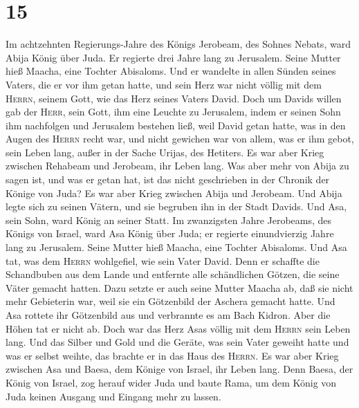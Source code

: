 \hypertarget{section-14}{%
\section{15}\label{section-14}}

 Im achtzehnten Regierungs-Jahre des Königs Jerobeam, des
Sohnes Nebats, ward Abija König über Juda.  Er regierte
drei Jahre lang zu Jerusalem. Seine Mutter hieß Maacha, eine Tochter
Abisaloms.  Und er wandelte in allen Sünden seines Vaters,
die er vor ihm getan hatte, und sein Herz war nicht völlig mit dem
\textsc{Herrn}, seinem Gott, wie das Herz seines Vaters David.
 Doch um Davids willen gab der \textsc{Herr}, sein Gott,
ihm eine Leuchte zu Jerusalem, indem er seinen Sohn ihm nachfolgen und
Jerusalem bestehen ließ,  weil David getan hatte, was in
den Augen des \textsc{Herrn} recht war, und nicht gewichen war von
allem, was er ihm gebot, sein Leben lang, außer in der Sache Urijas, des
Hetiters.  Es war aber Krieg zwischen Rehabeam und
Jerobeam, ihr Leben lang.  Was aber mehr von Abija zu
sagen ist, und was er getan hat, ist das nicht geschrieben in der
Chronik der Könige von Juda? Es war aber Krieg zwischen Abija und
Jerobeam.  Und Abija legte sich zu seinen Vätern, und sie
begruben ihn in der Stadt Davids. Und Asa, sein Sohn, ward König an
seiner Statt.  Im zwanzigsten Jahre Jerobeams, des Königs
von Israel, ward Asa König über Juda;  er regierte
einundvierzig Jahre lang zu Jerusalem. Seine Mutter hieß Maacha, eine
Tochter Abisaloms.  Und Asa tat, was dem \textsc{Herrn}
wohlgefiel, wie sein Vater David.  Denn er schaffte die
Schandbuben aus dem Lande und entfernte alle schändlichen Götzen, die
seine Väter gemacht hatten.  Dazu setzte er auch seine
Mutter Maacha ab, daß sie nicht mehr Gebieterin war, weil sie ein
Götzenbild der Aschera gemacht hatte. Und Asa rottete ihr Götzenbild aus
und verbrannte es am Bach Kidron. Aber die Höhen tat er nicht ab.
 Doch war das Herz Asas völlig mit dem \textsc{Herrn}
sein Leben lang.  Und das Silber und Gold und die Geräte,
was sein Vater geweiht hatte und was er selbst weihte, das brachte er in
das Haus des \textsc{Herrn}.  Es war aber Krieg zwischen
Asa und Baesa, dem Könige von Israel, ihr Leben lang. 
Denn Baesa, der König von Israel, zog herauf wider Juda und baute Rama,
um dem König von Juda keinen Ausgang und Eingang mehr zu lassen.
